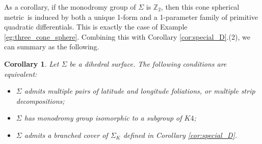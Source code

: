 \documentclass[pdflatex,sn-mathphys]{sn-jnl}%
\numberwithin{equation}{section}
\theoremstyle{thmstyleone}%
\newtheorem{corollary}[theorem]{Corollary}
\newcommand{\ZZ}{\mathbb{Z}}
\newcommand{\qdf}{quadratic differential}
\newcommand{\csphmtr}{cone spherical metric}
\begin{document}
As a corollary, if the monodromy group of $\Sigma$ is $\ZZ_2$, then this \csphmtr\ is induced by both a unique 1-form and a 1-parameter family of primitive \qdf s. This is exactly the case of Example \ref{eg:three_cone_sphere}. Combining this with Corollary \ref{cor:special_D}.(2), we can summary as the following.
\begin{corollary}
    Let $\Sigma$ be a dihedral surface. The following conditions are equivalent:\\
    \begin{itemize}
        \item $\Sigma$ admits multiple pairs of latitude and longitude foliations, or multiple strip decompositions;
        \item $\Sigma$ has monodromy group isomorphic to a subgroup of $K4$;
        \item $\Sigma$ admits a branched cover of $\Sigma_K$ defined in Corollary \ref{cor:special_D}.
    \end{itemize}
\end{corollary}
\end{document}
